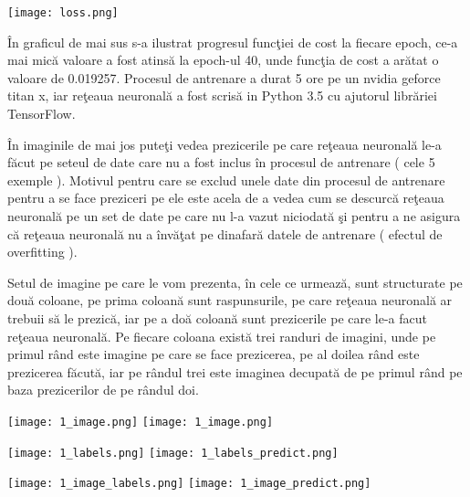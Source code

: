 \begin{center}
\texttt{[image: loss.png]}
\end{center}

\^{I}n graficul de mai sus s-a ilustrat progresul func\c{t}iei de cost la fiecare epoch, ce-a mai mic\u{a} valoare a fost atins\u{a} la epoch-ul 40, unde func\c{t}ia de cost a ar\u{a}tat o valoare de 0.019257. Procesul de antrenare a durat 5 ore pe un nvidia geforce titan x, iar re\c{t}eaua neuronal\u{a} a fost scris\u{a} in Python 3.5 cu ajutorul libr\u{a}riei TensorFlow.

\^{I}n imaginile de mai jos pute\c{t}i vedea prezicerile pe care re\c{t}eaua neuronal\u{a} le-a f\u{a}cut pe seteul de date care nu a fost inclus \^{i}n procesul de antrenare ( cele 5 exemple ). Motivul pentru care se exclud unele date din procesul de antrenare pentru a se face preziceri pe ele este acela de a vedea cum se descurc\u{a} re\c{t}eaua neuronal\u{a} pe un set de date pe care nu l-a vazut niciodat\u{a} \c{s}i pentru a ne asigura c\u{a} re\c{t}eaua neuronal\u{a} nu a \^{i}nv\u{a}\c{t}at pe dinafar\u{a} datele de antrenare ( efectul de overfitting ).

\par

Setul de imagine pe care le vom prezenta, \^{i}n cele ce urmeaz\u{a}, sunt structurate pe dou\u{a} coloane, pe prima coloan\u{a} sunt raspunsurile, pe care re\c{t}eaua neuronal\u{a} ar trebuii s\u{a} le prezic\u{a}, iar pe a do\u{a} coloan\u{a} sunt prezicerile pe care le-a facut re\c{t}eaua neuronal\u{a}. Pe fiecare coloana exist\u{a} trei randuri de imagini, unde pe primul r\^{a}nd este imagine pe care se face prezicerea, pe al doilea r\^{a}nd este prezicerea f\u{a}cut\u{a}, iar pe r\^{a}ndul trei este imaginea decupat\u{a} de pe primul r\^{a}nd pe baza prezicerilor de pe r\^{a}ndul doi.

\begin{center}
\texttt{[image: 1\_image.png]}
\texttt{[image: 1\_image.png]}
\end{center}

\begin{center}
\texttt{[image: 1\_labels.png]}
\texttt{[image: 1\_labels\_predict.png]}
\end{center}

\begin{center}
\texttt{[image: 1\_image\_labels.png]}
\texttt{[image: 1\_image\_predict.png]}
\end{center}

